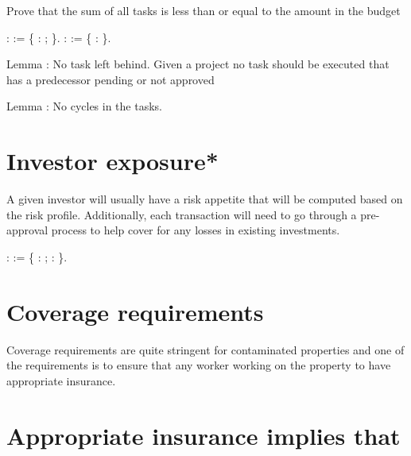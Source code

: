 \documentclass[12pt]{report}
\begin{document}
Prove that the sum of all tasks is less than or equal to the amount in the budget\begin{coqdoccode}
\coqdocemptyline
\coqdocnoindent
{}  :  :=  \{\coqdoceol
\coqdocindent{1.00em}
 : ; \coqdoceol
\coqdocnoindent
\}.\coqdoceol
\coqdocemptyline
\coqdocnoindent
{}  :  :=  \{\coqdoceol
\coqdocindent{1.00em}
 :  \coqdoceol
\coqdocnoindent
\}.\coqdoceol
\coqdocemptyline
\end{coqdoccode}
Lemma : No task left behind. Given a project no task should be executed that has a
predecessor pending or not approved 

 Lemma : No cycles in the tasks.

\section{Investor exposure*}


A given investor will usually have a risk appetite that will be computed based on the 
risk profile. Additionally, each transaction will need to go through 
a pre-approval process to help cover for any losses in existing investments.
\begin{coqdoccode}
\coqdocemptyline
\coqdocnoindent
{}  :  :=  \{\coqdoceol
\coqdocindent{1.00em}
 : ;\coqdoceol
\coqdocindent{1.00em}
 :  \coqdoceol
\coqdocnoindent
\}.\coqdoceol
\coqdocemptyline
\end{coqdoccode}
\section{Coverage requirements}


  Coverage requirements are quite stringent for contaminated properties and one of the 
  requirements is to ensure that any worker working on the property to have appropriate
  insurance. 
\section{Appropriate insurance implies that}
\end{document}
